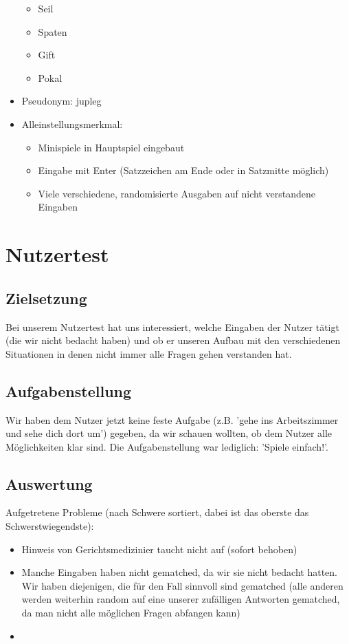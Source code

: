 \documentclass[10pt,a4paper]{article}
\begin{document}
\begin{itemize}
\begin{itemize}
\item Seil
\item Spaten
\item Gift
\item Pokal
\end{itemize}
\item Pseudonym: jupleg
\item Alleinstellungsmerkmal:
\begin{itemize}
\item Minispiele in Hauptspiel eingebaut
\item Eingabe mit Enter (Satzzeichen am Ende oder in Satzmitte möglich)
\item Viele verschiedene, randomisierte Ausgaben auf nicht verstandene Eingaben
\end{itemize}
\end{itemize}

\section*{Nutzertest}
\subsection*{Zielsetzung}
Bei unserem Nutzertest hat uns interessiert, welche Eingaben der Nutzer tätigt (die wir nicht bedacht haben) und ob er unseren Aufbau mit den verschiedenen Situationen in denen nicht immer alle Fragen gehen verstanden hat. 
\subsection*{Aufgabenstellung}
Wir haben dem Nutzer jetzt keine feste Aufgabe (z.B. 'gehe ins Arbeitszimmer und sehe dich dort um') gegeben, da wir schauen wollten, ob dem Nutzer alle Möglichkeiten klar sind. Die Aufgabenstellung war lediglich: 'Spiele einfach!'. \\

\subsection*{Auswertung}
Aufgetretene Probleme (nach Schwere sortiert, dabei ist das oberste das Schwerstwiegendste):
\begin{itemize}
\item Hinweis von Gerichtsmedizinier taucht nicht auf (sofort behoben)
\item Manche Eingaben haben nicht gematched, da wir sie nicht bedacht hatten. Wir haben diejenigen, die für den Fall sinnvoll sind gematched (alle anderen werden weiterhin random auf eine unserer zufälligen Antworten gematched, da man nicht alle möglichen Fragen abfangen kann)
\item 
\end{itemize}
\end{document}

